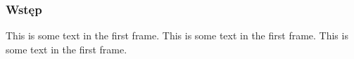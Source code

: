 \begin{frame}
    \frametitle{Wstęp}
    This is some text in the first frame. This is some text in the first frame. This is some text in the first frame.
\end{frame}